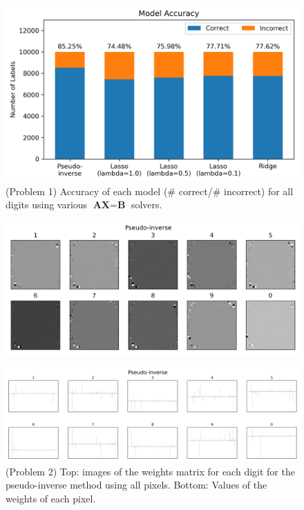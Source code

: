 \documentclass[10pt]{article}
\begin{document}
\begin{figure}[ht]
\centerline{\includegraphics[scale=0.75]{figures/all_data_accuracy_comparison.png}}
\caption{(Problem 1) Accuracy of each model (\# correct/\# incorrect) for all digits using various $\textbf{AX}=\textbf{B}$ solvers.}
\label{fig3}
\end{figure}

\begin{figure}[ht]
\centerline{\includegraphics[scale=0.8]{figures/weight_matrix_pinv.png}}
\label{fig4a}
\end{figure}

\begin{figure}[ht]
\centerline{\includegraphics[scale=0.5]{figures/bar_plot_loadings_pinv.png}}
\caption{(Problem 2) Top: images of the weights matrix for each digit for the pseudo-inverse method using all pixels. Bottom: Values of the weights of each pixel.}
\label{fig4b}
\end{figure}
\end{document}
